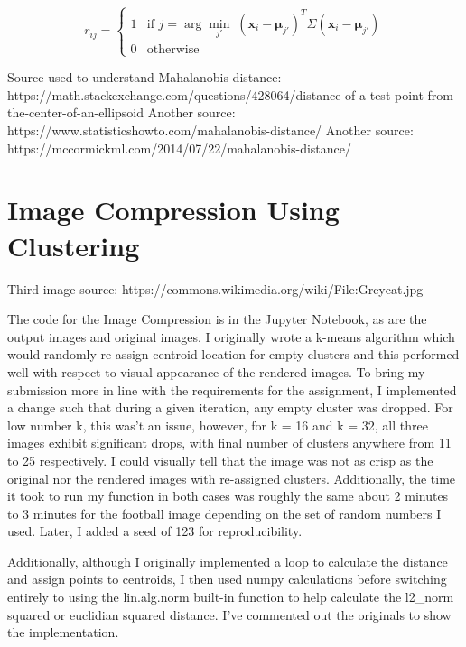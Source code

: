 \documentclass[twoside,10pt]{article}
\begin{document}
\begin{enumerate}
\[
r_{ij} = \begin{cases}
1 & \text{if } j = \arg \min_{j'} \; (\mathbf{x}_i - \boldsymbol{\mu}_{j'})^T \Sigma (\mathbf{x}_i - \boldsymbol{\mu}_{j'}) \\
0 & \text{otherwise}
\end{cases}
\]


Source used to understand Mahalanobis distance: https://math.stackexchange.com/questions/428064/distance-of-a-test-point-from-the-center-of-an-ellipsoid
Another source: https://www.statisticshowto.com/mahalanobis-distance/
Another source: https://mccormickml.com/2014/07/22/mahalanobis-distance/
\end{enumerate}

\section{Image Compression Using Clustering}

Third image source: https://commons.wikimedia.org/wiki/File:Greycat.jpg

The code for the Image Compression is in the Jupyter Notebook, as are the output images and original images.
I originally wrote a k-means algorithm which would randomly re-assign centroid location for empty clusters and this
performed well with respect to visual appearance of the rendered images. To bring my submission more in line
with the requirements for the assignment, I implemented a change such that during a given iteration, any empty
cluster was dropped. For low number k, this was't an issue, however, for k = 16 and k = 32, all three images
exhibit significant drops, with final number of clusters anywhere from 11 to 25 respectively. I could visually
tell that the image was not as crisp as the original nor the rendered images with re-assigned clusters. Additionally,
the time it took to run my function in both cases was roughly the same about 2 minutes to 3 minutes for the
football image depending on the set of random numbers I used. Later, I added a seed of 123 for reproducibility.

Additionally, although I originally implemented a loop to calculate the distance and assign points to centroids,
I then used numpy calculations before switching entirely to using the lin.alg.norm built-in function to help
calculate the l2_norm squared or euclidian squared distance. I've commented out the originals to show the implementation.
\end{document}
